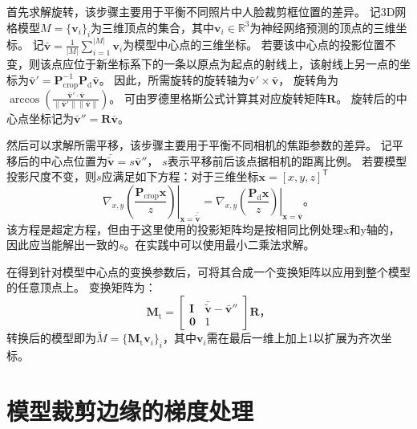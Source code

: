 首先求解旋转，该步骤主要用于平衡不同照片中人脸裁剪框位置的差异。
记3D网格模型$M=\{\mathbf{v}_i\}_i$为三维顶点的集合，其中$\mathbf{v}_i\in\mathbb{R}^3$为神经网络预测的顶点的三维坐标。
记$\bar{\mathbf{v}} = \frac{1}{|M|}\sum_{i=1}^{|M|}\mathbf{v}_i$为模型中心点的三维坐标。
若要该中心点的投影位置不变，则该点应位于新坐标系下的一条以原点为起点的射线上，该射线上另一点的坐标为$\bar{\mathbf{v}}' = \mathbf{P}_\mathrm{crop}^{-1}\mathbf{P}_\mathrm{d}\bar{\mathbf{v}}$。
因此，所需旋转的旋转轴为$\bar{\mathbf{v}}' \times \bar{\mathbf{v}}$，
旋转角为$\arccos\left(\frac{\bar{\mathbf{v}}'\cdot\bar{\mathbf{v}}}{\|\bar{\mathbf{v}}'\|\|\bar{\mathbf{v}}\|}\right)$。
可由罗德里格斯公式计算其对应旋转矩阵$\mathbf{R}$。
旋转后的中心点坐标记为$\bar{\mathbf{v}}'' = \mathbf{R}\bar{\mathbf{v}}$。

然后可以求解所需平移，该步骤主要用于平衡不同相机的焦距参数的差异。
记平移后的中心点位置为$\bar{\tilde{\mathbf{v}}} = s\bar{\mathbf{v}}''$，
$s$表示平移前后该点据相机的距离比例。
若要模型投影尺度不变，则$s$应满足如下方程：对于三维坐标$\mathbf{x}=[x,y,z]^\mathsf{T}$
\begin{equation}
    \left.\nabla_{x,y}\left(\frac{\mathbf{P}_\mathrm{crop}\mathbf{x}}{z}\right)\right|_{\mathbf{x}=\bar{\tilde{\mathbf{v}}}} =
    \left.\nabla_{x,y}\left(\frac{\mathbf{P}_\mathrm{d}\mathbf{x}}{z}\right)\right|_{\mathbf{x}=\bar{\mathbf{v}}}
    \text{。}
\end{equation}
该方程是超定方程，但由于这里使用的投影矩阵均是按相同比例处理x和y轴的，因此应当能解出一致的$s$。在实践中可以使用最小二乘法求解。

在得到针对模型中心点的变换参数后，可将其合成一个变换矩阵以应用到整个模型的任意顶点上。
变换矩阵为：
\begin{equation}
    \mathbf{M}_\mathrm{t} = \begin{bmatrix}
        \mathbf{I} & \bar{\tilde{\mathbf{v}}} - \bar{\mathbf{v}}'' \\
        \mathbf{0} & 1
    \end{bmatrix}\mathbf{R}
    \text{，}
\end{equation}
转换后的模型即为$\tilde{M}=\{\mathbf{M}_\mathrm{t}\mathbf{v}_i\}_i$，其中$\mathbf{v}_i$需在最后一维上加上1以扩展为齐次坐标。

\section{模型裁剪边缘的梯度处理}
\label{sec:recon_sdf}

